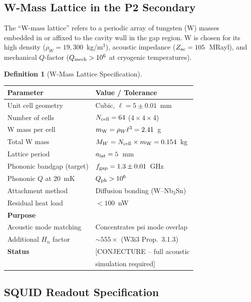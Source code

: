 \documentclass[11pt,twocolumn]{article}
\theoremstyle{definition}
\newtheorem{definition}[theorem]{Definition}
\theoremstyle{remark}
\begin{document}
\subsection{W-Mass Lattice in the P2 Secondary}
\label{sec:W_lattice}

The ``W-mass lattice'' refers to a periodic array of tungsten (W) masses
embedded in or affixed to the cavity wall in the gap region.
W is chosen for its high density ($\rho_W = 19{,}300$~kg/m$^3$),
acoustic impedance ($Z_{\rm ac} = 105$~MRayl), and mechanical $Q$-factor
($Q_{\rm mech} > 10^6$ at cryogenic temperatures).

\begin{definition}[W-Mass Lattice Specification]
\label{def:W_lattice}
\begin{center}
\renewcommand{\arraystretch}{1.2}
\begin{tabular}{@{}p{3.5cm}p{4.5cm}@{}}
\toprule
Parameter & Value / Tolerance \\
\midrule
Unit cell geometry & Cubic, $\ell = 5 \pm 0.01$~mm \\
Number of cells & $N_{\rm cell} = 64$ ($4\times4\times4$) \\
W mass per cell & $m_{\rm W} = \rho_W\ell^3 = 2.41$~g \\
Total W mass & $M_W = N_{\rm cell}\times m_{\rm W} = 0.154$~kg \\
Lattice period & $a_{\rm lat} = 5$~mm \\
Phononic bandgap (target) & $f_{\rm gap} = 1.3 \pm 0.01$~GHz \\
Phononic $Q$ at 20~mK & $Q_{\rm ph} > 10^6$ \\
Attachment method & Diffusion bonding (W--Nb$_3$Sn) \\
Residual heat load & $< 100$~nW \\
\midrule
\textbf{Purpose} & \\
Acoustic mode matching & Concentrates psi mode overlap \\
Additional $H_n$ factor & $\sim 555\times$ (W3i3 Prop.~3.1.3) \\
\textbf{Status} & [CONJECTURE -- full acoustic \\
& simulation required] \\
\bottomrule
\end{tabular}
\end{center}
\end{definition}

\subsection{SQUID Readout Specification}
\label{sec:squid_spec}
\end{document}
